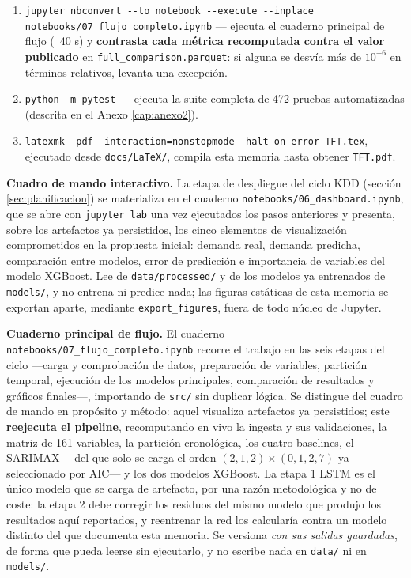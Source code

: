 \begin{sloppypar}
{\begin{enumerate}[nosep]
    LaTeX de \texttt{docs/\allowbreak{}LaTeX/\allowbreak{}tables/}.
  \item \texttt{jupyter nbconvert -{}-to notebook -{}-execute -{}-inplace
    notebooks/\allowbreak{}07\_flujo\_completo.ipynb} — ejecuta el cuaderno principal de
    flujo (~40 s) y \textbf{contrasta cada métrica recomputada contra el valor publicado}
    en \texttt{full\_comparison.parquet}: si alguna se desvía más de $10^{-6}$ en términos
    relativos, levanta una excepción.
  \item \texttt{python -m pytest} — ejecuta la suite completa de 472 pruebas automatizadas (descrita
    en el Anexo \ref{cap:anexo2}).
  \item \texttt{latexmk -pdf -interaction=nonstopmode -halt-on-error TFT.tex}, ejecutado
    desde \texttt{docs/\allowbreak{}LaTeX/}, compila esta memoria hasta obtener \texttt{TFT.pdf}.
\end{enumerate}
}

\textbf{Cuadro de mando interactivo.} La etapa de despliegue del ciclo KDD (sección
\ref{sec:planificacion}) se materializa en el cuaderno
\texttt{notebooks/\allowbreak{}06\_dashboard.ipynb}, que se abre con \texttt{jupyter lab}
una vez ejecutados los pasos anteriores y presenta, sobre los artefactos ya persistidos,
los cinco elementos de visualización comprometidos en la propuesta inicial: demanda real,
demanda predicha, comparación entre modelos, error de predicción e importancia de
variables del modelo XGBoost. Lee de \texttt{data/\allowbreak{}processed/} y de los modelos
ya entrenados de \texttt{models/}, y no entrena ni predice nada; las figuras estáticas de
esta memoria se exportan aparte, mediante \texttt{export\_figures}, fuera de todo núcleo
de Jupyter.

\textbf{Cuaderno principal de flujo.} El cuaderno
\texttt{notebooks/\allowbreak{}07\_flujo\_completo.ipynb} recorre el trabajo en las seis
etapas del ciclo —carga y comprobación de datos, preparación de variables, partición
temporal, ejecución de los modelos principales, comparación de resultados y gráficos
finales—, importando de \texttt{src/} sin duplicar lógica. Se distingue del cuadro de mando
en propósito y método: aquel visualiza artefactos ya persistidos; este \textbf{reejecuta el
pipeline}, recomputando en vivo la ingesta y sus validaciones, la matriz de 161 variables,
la partición cronológica, los cuatro baselines, el SARIMAX —del que solo se carga el orden
$(2,1,2)\times(0,1,2,7)$ ya seleccionado por AIC— y los dos modelos XGBoost. La etapa 1
LSTM es el único modelo que se carga de artefacto, por una razón metodológica y no de
coste: la etapa 2 debe corregir los residuos del mismo modelo que produjo los resultados
aquí reportados, y reentrenar la red los calcularía contra un modelo distinto del que
documenta esta memoria. Se versiona \emph{con sus salidas guardadas}, de forma que pueda
leerse sin ejecutarlo, y no escribe nada en \texttt{data/} ni en \texttt{models/}.


\end{sloppypar}
